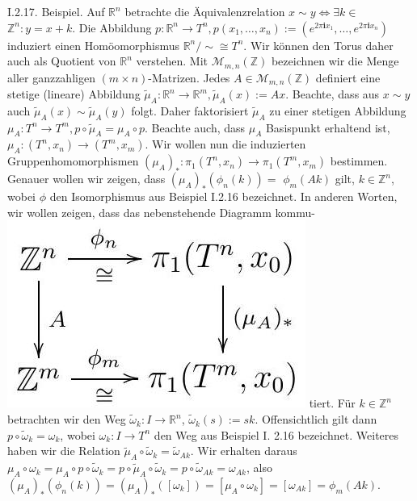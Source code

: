 \documentclass[10pt, letterpaper]{article}
\begin{document}
I.2.17. Beispiel. Auf $\mathbb{R}^{n}$ betrachte die Äquivalenzrelation $x \sim y \Leftrightarrow \exists k \in$ $\mathbb{Z}^{n}: y=x+k$. Die Abbildung $p: \mathbb{R}^{n} \rightarrow T^{n}, p\left(x_{1}, \ldots, x_{n}\right):=\left(e^{2 \pi \mathbf{i} x_{1}}, \ldots, e^{2 \pi \mathbf{i} x_{n}}\right)$ induziert einen Homöomorphismus $\mathbb{R}^{n} / \sim \cong T^{n}$. Wir können den Torus daher auch als Quotient von $\mathbb{R}^{n}$ verstehen. Mit $\mathcal{M}_{m, n}(\mathbb{Z})$ bezeichnen wir die Menge aller ganzzahligen $(m \times n)$-Matrizen. Jedes $A \in \mathcal{M}_{m, n}(\mathbb{Z})$ definiert eine stetige (lineare) Abbildung $\tilde{\mu}_{A}: \mathbb{R}^{n} \rightarrow \mathbb{R}^{m}, \tilde{\mu}_{A}(x):=A x$. Beachte, dass aus $x \sim y$ auch $\tilde{\mu}_{A}(x) \sim \tilde{\mu}_{A}(y)$ folgt. Daher faktorisiert $\tilde{\mu}_{A}$ zu einer stetigen Abbildung $\mu_{A}: T^{n} \rightarrow T^{m}, p \circ \tilde{\mu}_{A}=\mu_{A} \circ p$. Beachte auch, dass $\mu_{A}$ Basispunkt erhaltend ist, $\mu_{A}:\left(T^{n}, x_{n}\right) \rightarrow\left(T^{m}, x_{m}\right)$. Wir wollen nun die induzierten Gruppenhomomorphismen $\left(\mu_{A}\right)_{*}: \pi_{1}\left(T^{n}, x_{n}\right) \rightarrow \pi_{1}\left(T^{m}, x_{m}\right)$ bestimmen. Genauer wollen wir zeigen, dass $\left(\mu_{A}\right)_{*}\left(\phi_{n}(k)\right)=$ $\phi_{m}(A k)$ gilt, $k \in \mathbb{Z}^{n}$, wobei $\phi$ den Isomorphismus aus Beispiel I.2.16 bezeichnet. In anderen Worten, wir wollen zeigen, dass das nebenstehende Diagramm kommu-\\
\includegraphics[max width=\textwidth]{2025_06_05_d7ed2bacd1e9ce1db1f0g-020} tiert. Für $k \in \mathbb{Z}^{n}$ betrachten wir den Weg $\tilde{\omega}_{k}: I \rightarrow \mathbb{R}^{n}$, $\tilde{\omega}_{k}(s):=s k$. Offensichtlich gilt dann $p \circ \tilde{\omega}_{k}=\omega_{k}$, wobei $\omega_{k}: I \rightarrow T^{n}$ den Weg aus Beispiel I. 2.16 bezeichnet. Weiteres haben wir die Relation $\tilde{\mu}_{A} \circ \tilde{\omega}_{k}=\tilde{\omega}_{A k}$. Wir erhalten daraus $\mu_{A} \circ \omega_{k}=\mu_{A} \circ p \circ \tilde{\omega}_{k}=p \circ \tilde{\mu}_{A} \circ \tilde{\omega}_{k}=p \circ \tilde{\omega}_{A k}=\omega_{A k}$, also $\left(\mu_{A}\right)_{*}\left(\phi_{n}(k)\right)=\left(\mu_{A}\right)_{*}\left(\left[\omega_{k}\right]\right)=\left[\mu_{A} \circ \omega_{k}\right]=\left[\omega_{A k}\right]=\phi_{m}(A k)$.
\end{document}
